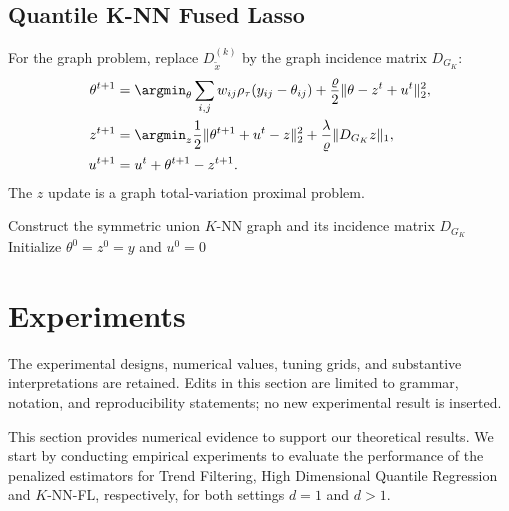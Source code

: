 \documentclass[twoside,11pt]{article}
\newenvironment{revision}{\color{revisionred}}{}
\begin{document}
\subsection{Quantile K-NN Fused Lasso}
\begin{revision}
For the graph problem, replace $D^{(k)}_{\widetilde x}$ by the graph incidence matrix $D_{G_K}$:
\begin{align}
 \theta^{t+1}&=\argmin_\theta
 \sum_{i,j}w_{ij}\rho_\tau(y_{ij}-\theta_{ij})
 +\frac\varrho2\|\theta-z^t+u^t\|_2^2,                     \label{82}\\
 z^{t+1}&=\argmin_z\frac12\|\theta^{t+1}+u^t-z\|_2^2
 +\frac\lambda\varrho\|D_{G_K}z\|_1,                      \label{83}\\
 u^{t+1}&=u^t+\theta^{t+1}-z^{t+1}.                           \label{84}
\end{align}
The $z$ update is a graph total-variation proximal problem.
\end{revision}

\begin{algorithm}[!htbp]
\caption{ADMM for quantile $K$-NN graph fused lasso}\label{alg_knn_admm}
Construct the symmetric union $K$-NN graph and its incidence matrix $D_{G_K}$\;
Initialize $\theta^0=z^0=y$ and $u^0=0$\;
\end{algorithm}


\section{Experiments}
\begin{revision}The experimental designs, numerical values, tuning grids, and substantive interpretations are retained. Edits in this section are limited to grammar, notation, and reproducibility statements; no new experimental result is inserted.\end{revision}

This section provides numerical evidence to support our theoretical results. We start by conducting empirical experiments to evaluate the performance of the penalized estimators for Trend Filtering, High Dimensional Quantile Regression and \( K \)-NN-FL, respectively, for both settings \( d = 1 \) and \( d > 1 \). 
\end{document}
